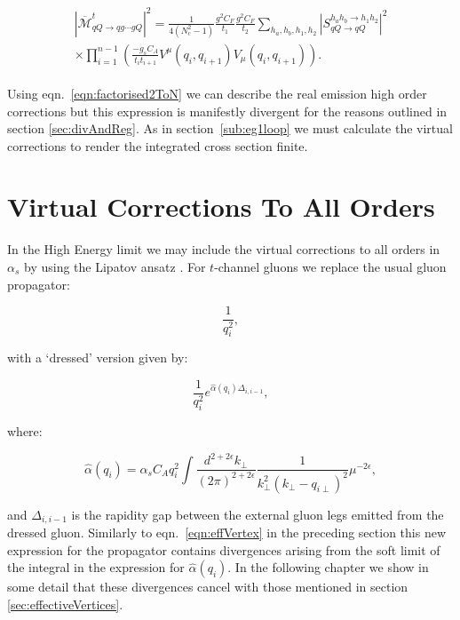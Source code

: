 		\begin{align}
		\begin{split}
			|\overline{\mathcal{M}}^t_{qQ\rightarrow qg\cdots gQ}|^2 = \frac{1}{4(N_c^2-1)}
			\frac{g^2C_F}{t_1}\frac{g^2C_F}{t_2} \sum_{h_a, h_b, h_1, h_2}
			|S_{qQ\rightarrow qQ}^{h_ah_b\rightarrow h_1h_2}|^2\\
			\times\prod_{i=1}^{n-1}\left(\frac{-g_sC_A}{t_it_{i+1}}V^\mu(q_i, q_{i+1})V_\mu(q_i, q_{i+1})\right).
			\label{eqn:factorised2ToN}
		\end{split}
		\end{align}

		Using eqn.~\eqref{eqn:factorised2ToN} we can describe the real emission high order
		corrections but this expression is manifestly divergent for the reasons outlined in
		section \ref{sec:divAndReg}.  As in section~\ref{sub:eg1loop} we must calculate the
		virtual corrections to render the integrated cross section finite.

	\section{Virtual Corrections To All Orders}
		\label{sub:virtuals}

		In the High Energy limit we may include the virtual corrections to all orders in $\alpha_s$ by using
		the Lipatov ansatz \cite{Kuraev:1976ge}.  For $t$-channel gluons we replace the usual
		gluon propagator:

		\begin{equation}
			\frac{1}{q_i^2},
		\end{equation}

		with a `dressed' version given by:

		\begin{equation}
			\frac{1}{q_i^2}e^{\hat{\alpha}(q_i)\Delta_{i,i-1}},
		\end{equation}

		where:

		\begin{equation}
			\hat{\alpha}(q_i) = \alpha_sC_Aq_i^2\int \frac{d^{2+2\epsilon}k_{\perp}}{(2\pi)^{2+2\epsilon}}
			\frac{1}{k^2_\perp(k_\perp - q_{i\perp})^2}\mu^{-2\epsilon},
		\end{equation}

		and $\Delta_{i,i-1}$ is the rapidity gap between the external gluon legs emitted from
		the dressed gluon.  Similarly to eqn.~\eqref{eqn:effVertex} in the preceding section this
		new expression for the propagator contains divergences arising from the soft limit
		of the integral in the expression for $\hat{\alpha}(q_i)$.  In the following chapter we
		show in some detail that these divergences cancel with those mentioned in section
		\ref{sec:effectiveVertices}.

